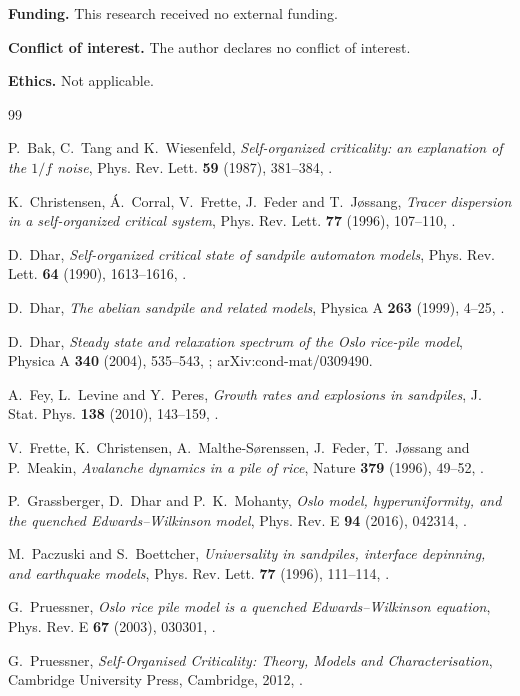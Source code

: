\documentclass[11pt]{amsart}
\theoremstyle{definition}
\theoremstyle{remark}
\begin{document}
\noindent\textbf{Funding.} This research received no external funding.

\noindent\textbf{Conflict of interest.} The author declares no conflict of interest.

\noindent\textbf{Ethics.} Not applicable.

\begin{thebibliography}{99}

 P.~Bak, C.~Tang and K.~Wiesenfeld, \emph{Self-organized criticality: an explanation of the $1/f$ noise}, Phys. Rev. Lett. \textbf{59} (1987), 381--384, .

 K.~Christensen, \'A.~Corral, V.~Frette, J.~Feder and T.~J{\o}ssang, \emph{Tracer dispersion in a self-organized critical system}, Phys. Rev. Lett. \textbf{77} (1996), 107--110, .

 D.~Dhar, \emph{Self-organized critical state of sandpile automaton models}, Phys. Rev. Lett. \textbf{64} (1990), 1613--1616, .

 D.~Dhar, \emph{The abelian sandpile and related models}, Physica A \textbf{263} (1999), 4--25, .

 D.~Dhar, \emph{Steady state and relaxation spectrum of the Oslo rice-pile model}, Physica A \textbf{340} (2004), 535--543, ; arXiv:cond-mat/0309490.

 A.~Fey, L.~Levine and Y.~Peres, \emph{Growth rates and explosions in sandpiles}, J. Stat. Phys. \textbf{138} (2010), 143--159, .

 V.~Frette, K.~Christensen, A.~Malthe-S{\o}renssen, J.~Feder, T.~J{\o}ssang and P.~Meakin, \emph{Avalanche dynamics in a pile of rice}, Nature \textbf{379} (1996), 49--52, .

 P.~Grassberger, D.~Dhar and P.~K.~Mohanty, \emph{Oslo model, hyperuniformity, and the quenched Edwards--Wilkinson model}, Phys. Rev. E \textbf{94} (2016), 042314, .

 M.~Paczuski and S.~Boettcher, \emph{Universality in sandpiles, interface depinning, and earthquake models}, Phys. Rev. Lett. \textbf{77} (1996), 111--114, .

 G.~Pruessner, \emph{Oslo rice pile model is a quenched Edwards--Wilkinson equation}, Phys. Rev. E \textbf{67} (2003), 030301, .

 G.~Pruessner, \emph{Self-Organised Criticality: Theory, Models and Characterisation}, Cambridge University Press, Cambridge, 2012, .

\end{thebibliography}
\end{document}
